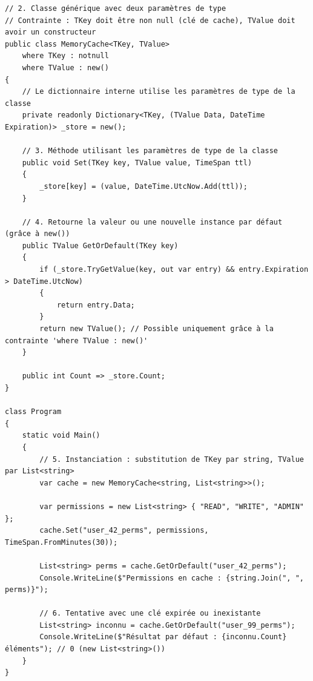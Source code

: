 \begin{lstlisting}[caption={Classe générique : Cache en mémoire avec expiration}]
// 2. Classe générique avec deux paramètres de type
// Contrainte : TKey doit être non null (clé de cache), TValue doit avoir un constructeur
public class MemoryCache<TKey, TValue> 
    where TKey : notnull 
    where TValue : new()
{
    // Le dictionnaire interne utilise les paramètres de type de la classe
    private readonly Dictionary<TKey, (TValue Data, DateTime Expiration)> _store = new();

    // 3. Méthode utilisant les paramètres de type de la classe
    public void Set(TKey key, TValue value, TimeSpan ttl)
    {
        _store[key] = (value, DateTime.UtcNow.Add(ttl));
    }

    // 4. Retourne la valeur ou une nouvelle instance par défaut (grâce à new())
    public TValue GetOrDefault(TKey key)
    {
        if (_store.TryGetValue(key, out var entry) && entry.Expiration > DateTime.UtcNow)
        {
            return entry.Data;
        }
        return new TValue(); // Possible uniquement grâce à la contrainte 'where TValue : new()'
    }

    public int Count => _store.Count;
}

class Program
{
    static void Main()
    {
        // 5. Instanciation : substitution de TKey par string, TValue par List<string>
        var cache = new MemoryCache<string, List<string>>();

        var permissions = new List<string> { "READ", "WRITE", "ADMIN" };
        cache.Set("user_42_perms", permissions, TimeSpan.FromMinutes(30));

        List<string> perms = cache.GetOrDefault("user_42_perms");
        Console.WriteLine($"Permissions en cache : {string.Join(", ", perms)}");

        // 6. Tentative avec une clé expirée ou inexistante
        List<string> inconnu = cache.GetOrDefault("user_99_perms");
        Console.WriteLine($"Résultat par défaut : {inconnu.Count} éléments"); // 0 (new List<string>())
    }
}
\end{lstlisting}


